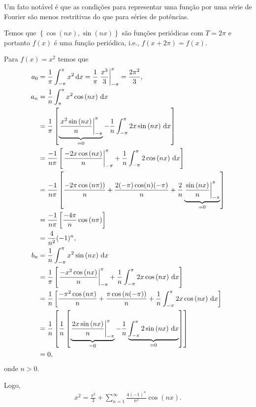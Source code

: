 Um fato not\'{a}vel \'{e} que as condi\c{c}\~{o}es para representar uma fun\c{c}\~{a}o por uma s\'{e}rie de Fourier s\~{a}o menos restritivas do que para s\'{e}ries de pot\^{e}ncias.

\begin{obs}
    Temos que $\left\{ \cos\left( n x \right), \sin\left( n x \right) \right\}$ s\~{a}o fun\c{c}\~{o}es peri\'{o}dicas com $T = 2\pi$ e portanto $f(x)$ \'{e} uma fun\c{c}\~{a}o peri\'{o}dica, i.e., $f(x + 2\pi) = f(x)$.
\end{obs}

\begin{exem} \label{exem:fourier:x^2}
    Para $f(x) = x^2$ temos que
    \begin{align*}
        a_0 &= \frac{1}{\pi} \int_{-\pi}^\pi x^2 \, \mathrm{d}x = \frac{1}{\pi} \left. \frac{x^3}{3} \right|_{-\pi}^\pi = \frac{2 \pi^2}{3}, \\
        a_n &= \frac{1}{n} \int_{\pi}^\pi x^2 \cos\left( n x \right) \, \mathrm{d}x \\
        &= \frac{1}{\pi} \left[ \underbrace{\left. \frac{x^2 \sin\left( n x \right)}{n} \right|_{-\pi}^\pi}_{= 0} - \frac{1}{n} \int_{-\pi}^\pi 2 x \sin\left( n x \right) \, \mathrm{d}x \right] \\
        &= \frac{-1}{n \pi} \left[ \left. \frac{-2 x \cos\left( n x \right)}{n} \right|_{-\pi}^\pi + \frac{1}{n} \int_{-\pi}^\pi 2 \cos\left( n x \right) \, \mathrm{d}x \right] \\
        &= \frac{-1}{n \pi} \left[ \frac{-2 \pi \cos\left( n \pi) \right)}{n} + \frac{2 (-\pi) \cos(n) (-\pi)}{n} + \frac{2}{n} \underbrace{\left. \frac{\sin\left( n x \right)}{n} \right|_{-\pi}^\pi}_{= 0} \right] \\
        &= \frac{-1}{n \pi} \left[ \frac{- 4 \pi}{n} \cos\left( n \pi \right) \right] \\
        &= \frac{4}{n^2} (-1)^n, \\
        b_n &= \frac{1}{n} \int_{-\pi}^\pi x^2 \sin\left( n x \right) \, \mathrm{d}x \\
        &= \frac{1}{\pi} \left[ \left. \frac{- x^2 \cos\left( n x \right)}{n} \right|_{-\pi}^\pi + \frac{1}{n} \int_{-\pi}^\pi 2 x \cos\left( n x \right) \, \mathrm{d}x \right] \\
        &= \frac{1}{n} \left[ \frac{-\pi^2 \cos\left( n \pi \right)}{n} + \frac{\pi \cos\left( n (-\pi) \right)}{n} + \frac{1}{n} \int_{-\pi}^\pi 2 x \cos\left( n x \right) \, \mathrm{d}x \right] \\ 
        &= \frac{1}{n} \left[ \frac{1}{n} \left[ \underbrace{\left. \frac{2 x \sin\left( n x \right)}{n} \right|_{-\pi}^\pi}_{= 0} - \frac{1}{n} \underbrace{\int_{-\pi}^\pi 2 \sin\left( n x \right) \, \mathrm{d}x}_{= 0} \right] \right] \\
        &= 0,
    \end{align*}
    onde $n > 0$.

    Logo,
    \begin{align*}
        x^2 = \frac{\pi^2}{3} + \sum_{n = 1}^\infty \frac{4 (-1)^n}{n^2} \cos\left( n x \right).
    \end{align*}
\end{exem}

